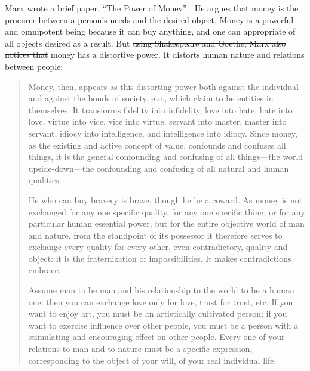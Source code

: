 \documentclass[10pt, letterpaper]{article}
\providecommand{\DIFaddtex}[1]{{\protect\color{blue}\uwave{#1}}} %
\providecommand{\DIFdeltex}[1]{{\protect\color{red}\sout{#1}}}                      %
\providecommand{\DIFaddbegin}{} %
\providecommand{\DIFaddend}{} %
\providecommand{\DIFdelbegin}{} %
\providecommand{\DIFdelend}{} %
\providecommand{\DIFadd}[1]{\texorpdfstring{\DIFaddtex{#1}}{#1}} %
\providecommand{\DIFdel}[1]{\texorpdfstring{\DIFdeltex{#1}}{}} %
\newcommand{\DIFscaledelfig}{0.5}
\newlength{\DIFdelgraphicswidth} %
\newlength{\DIFdelgraphicsheight} %
\newcommand{\DIFaddincludegraphics}[2][]{{\color{blue}\fbox{\DIFOincludegraphics[#1]{#2}}}} %
\newcommand{\DIFdelincludegraphics}[2][]{%
\sbox{\DIFdelgraphicsbox}{\DIFOincludegraphics[#1]{#2}}%
\settoboxwidth{\DIFdelgraphicswidth}{\DIFdelgraphicsbox} %
\settoboxtotalheight{\DIFdelgraphicsheight}{\DIFdelgraphicsbox} %
\scalebox{\DIFscaledelfig}{%
\parbox[b]{\DIFdelgraphicswidth}{\usebox{\DIFdelgraphicsbox}\\[-\baselineskip] \rule{\DIFdelgraphicswidth}{0em}}\llap{\resizebox{\DIFdelgraphicswidth}{\DIFdelgraphicsheight}{%
\setlength{\unitlength}{\DIFdelgraphicswidth}%
\begin{picture}(1,1)%
\thicklines\linethickness{2pt} %
{\color[rgb]{1,0,0}\put(0,0){\framebox(1,1){}}}%
{\color[rgb]{1,0,0}\put(0,0){\line( 1,1){1}}}%
{\color[rgb]{1,0,0}\put(0,1){\line(1,-1){1}}}%
\end{picture}%
}\hspace*{3pt}}} %
} %
\DeclareRobustCommand{\DIFaddbegin}{\DIFOaddbegin \let\includegraphics\DIFaddincludegraphics} %
\DeclareRobustCommand{\DIFaddend}{\DIFOaddend \let\includegraphics\DIFOincludegraphics} %
\DeclareRobustCommand{\DIFdelbegin}{\DIFOdelbegin \let\includegraphics\DIFdelincludegraphics} %
\DeclareRobustCommand{\DIFdelend}{\DIFOaddend \let\includegraphics\DIFOincludegraphics} %
\begin{document}
\begin{spacing}{1.8}
Marx wrote a brief paper, ``The Power of Money'' \citep{marx1844-powerOfMoney}. He argues that money is the procurer between a person's needs and the desired object. Money is a powerful and omnipotent being because it can buy anything, and one can appropriate of all objects desired as a result.
But \DIFdelbegin \DIFdel{using Shakespeare and Goethe, Marx also notices that }\DIFdelend %
\DIFaddbegin \DIFadd{also %
}\DIFaddend money has a distortive power. It distorts human nature and relations between people:
\begin{quote}
Money, then, appears as this distorting power both against the individual and against the bonds of society, etc., which claim to be entities in themselves. It transforms fidelity into infidelity, love into hate, hate into love, virtue into vice, vice into virtue, servant into master, master into servant, idiocy into intelligence, and intelligence into idiocy. Since money, as the existing and active concept of value, confounds and confuses all things, it is the general confounding and confusing of all things---the world upside-down---the confounding and confusing of all natural and human qualities.

He who can buy bravery is brave, though he be a coward. As money is not exchanged for any one specific quality, for any one specific thing, or for any particular human essential power, but for the entire objective world of man and nature, from the standpoint of its possessor it therefore serves to exchange every quality for every other, even contradictory, quality and object: it is the fraternization of impossibilities. It makes contradictions embrace.

Assume man to be man and his relationship to the world to be a human one: then you can exchange love only for love, trust for trust, etc. If you want to enjoy art, you must be an artistically cultivated person; if you want to exercise influence over other people, you must be a person with a stimulating and encouraging effect on other people. Every one of your relations to man and to nature must be a specific expression, corresponding to the object of your will, of your real individual life.
\end{quote}


\end{spacing}
\end{document}
